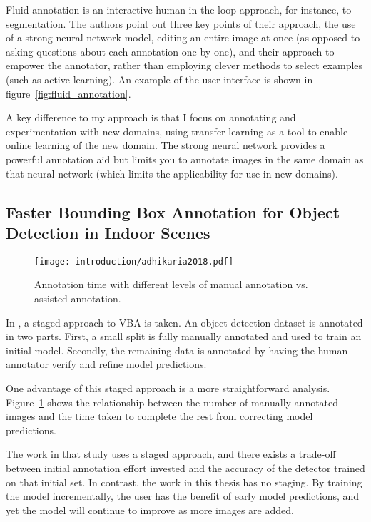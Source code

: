 Fluid annotation is an interactive human-in-the-loop approach, for instance, to segmentation. The authors point out three key points of their approach, the use of a strong neural network model, editing an entire image at once (as opposed to asking questions about each annotation one by one), and their approach to empower the annotator, rather than employing clever methods to select examples (such as active learning). An example of the user interface is shown in figure~\ref{fig:fluid_annotation}.

A key difference to my approach is that I focus on annotating and experimentation with new domains, using transfer learning as a tool to enable online learning of the new domain. The strong neural network provides a powerful annotation aid but limits you to annotate images in the same domain as that neural network (which limits the applicability for use in new domains).

\subsection{Faster Bounding Box Annotation for Object Detection in Indoor Scenes}

\begin{figure}[h]
  \centering
  \texttt{[image: introduction/adhikaria2018.pdf]}
  \caption{Annotation time with different levels of manual annotation vs. assisted annotation. \cite{Adhikaria2018}}  
  \label{fig:adhikaria2018}
\end{figure}

In \cite{Adhikaria2018}, a staged approach to \gls{VBA} is taken. An object detection dataset is annotated in two parts. First, a small split is fully manually annotated and used to train an initial model. Secondly, the remaining data is annotated by having the human annotator verify and refine model predictions. 

One advantage of this staged approach is a more straightforward analysis. Figure~\ref{fig:adhikaria2018} shows the relationship between the number of manually annotated images and the time taken to complete the rest from correcting model predictions.

The work in that study uses a staged approach, and there exists a trade-off between initial annotation effort invested and the accuracy of the detector trained on that initial set. In contrast, the work in this thesis has no staging. By training the model incrementally, the user has the benefit of early model predictions, and yet the model will continue to improve as more images are added.

